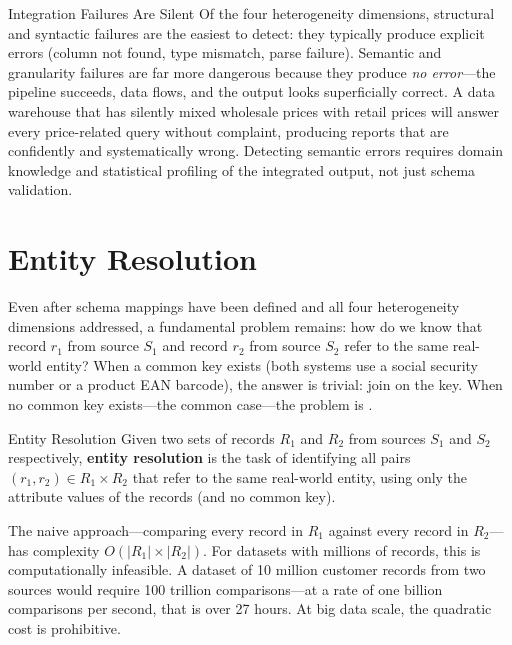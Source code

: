 \begin{techdebt}{Integration Failures Are Silent}
Of the four heterogeneity dimensions, structural and syntactic failures
are the easiest to detect: they typically produce explicit errors
(column not found, type mismatch, parse failure). Semantic and
granularity failures are far more dangerous because they produce
\emph{no error}---the pipeline succeeds, data flows, and the output
looks superficially correct. A data warehouse that has silently mixed
wholesale prices with retail prices will answer every price-related
query without complaint, producing reports that are confidently and
systematically wrong. Detecting semantic errors requires domain
knowledge and statistical profiling of the integrated output, not
just schema validation.
\end{techdebt}

\section{Entity Resolution}
\label{sec:er}

Even after schema mappings have been defined and all four heterogeneity
dimensions addressed, a fundamental problem remains: how do we know that
record $r_1$ from source $S_1$ and record $r_2$ from source $S_2$ refer
to the same real-world entity? When a common key exists (both systems
use a social security number or a product EAN barcode), the answer is
trivial: join on the key. When no common key exists---the common
case---the problem is .

\begin{defbox}{Entity Resolution}
Given two sets of records $R_1$ and $R_2$ from sources $S_1$ and $S_2$
respectively, \textbf{entity resolution} is the task of identifying all
pairs $(r_1, r_2) \in R_1 \times R_2$ that refer to the same
real-world entity, using only the attribute values of the records (and
no common key).
\end{defbox}

The naive approach---comparing every record in $R_1$ against every
record in $R_2$---has complexity $O(|R_1| \times |R_2|)$. For datasets
with millions of records, this is computationally infeasible. A dataset
of 10 million customer records from two sources would require 100
trillion comparisons---at a rate of one billion comparisons per second,
that is over 27 hours. At big data scale, the quadratic cost is
prohibitive.

